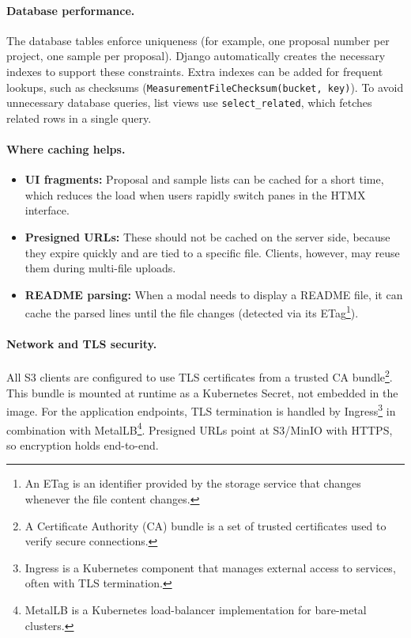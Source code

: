 \paragraph{Database performance.}
The database tables enforce uniqueness (for example, one proposal number per project, one sample per proposal).  
Django automatically creates the necessary indexes to support these constraints.  
Extra indexes can be added for frequent lookups, such as checksums (\texttt{MeasurementFileChecksum(bucket, key)}).  
To avoid unnecessary database queries, list views use \texttt{select\_related}, which fetches related rows in a single query.

\paragraph{Where caching helps.}
\begin{itemize}
	\item \textbf{UI fragments:} Proposal and sample lists can be cached for a short time, which reduces the load when users rapidly switch panes in the HTMX interface.  
	\item \textbf{Presigned URLs:} These should not be cached on the server side, because they expire quickly and are tied to a specific file.  
	Clients, however, may reuse them during multi-file uploads.  
	\item \textbf{README parsing:} When a modal needs to display a README file, it can cache the parsed lines until the file changes (detected via its ETag\footnote{An ETag is an identifier provided by the storage service that changes whenever the file content changes.}).  
\end{itemize}

\paragraph{Network and TLS security.}
All S3 clients are configured to use TLS certificates from a trusted CA bundle\footnote{A Certificate Authority (CA) bundle is a set of trusted certificates used to verify secure connections.}.  
This bundle is mounted at runtime as a Kubernetes Secret, not embedded in the image.  
For the application endpoints, TLS termination is handled by Ingress\footnote{Ingress is a Kubernetes component that manages external access to services, often with TLS termination.} in combination with MetalLB\footnote{MetalLB is a Kubernetes load-balancer implementation for bare-metal clusters.}.  
Presigned URLs point at S3/MinIO with HTTPS, so encryption holds end-to-end.

